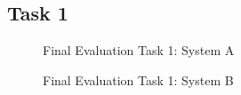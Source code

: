 \subsection*{Task 1}
\begin{figure}[!h]
  \centering
  \begin{minipage}[b]{0.47\textwidth}
    \caption{Final Evaluation Task 1: System A}
  \end{minipage}
  \hfill
  \begin{minipage}[b]{0.47\textwidth}
  \caption{Final Evaluation Task 1: System B}
  \end{minipage}
\end{figure}

